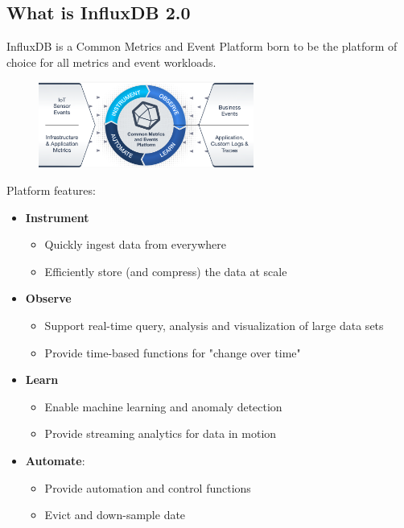 \documentclass[10pt,a4paper]{article}
\begin{document}
\subsection{What is InfluxDB 2.0}
InfluxDB is a Common Metrics and Event Platform born to be the platform of choice for all metrics and event workloads.
   \begin{figure}[ht!]
 \hfill \includegraphics[width=200pt]{images/influxdb}
 \hspace*{\fill}
 \end{figure} 
Platform features:
\begin{itemize}
	\item \textbf{Instrument}
	\begin{itemize}
		\item Quickly ingest data from everywhere
		\item Efficiently store (and compress) the data at scale
	\end{itemize}
	\item \textbf{Observe}
	\begin{itemize}
		\item Support real-time query, analysis and visualization of large data sets
		\item Provide time-based functions for "change over time"
	\end{itemize}
	\item \textbf{Learn}
	\begin{itemize}
		\item Enable machine learning and anomaly detection
		\item Provide streaming analytics for data in motion
	\end{itemize}
	\item \textbf{Automate}:
	\begin{itemize}
		\item Provide automation and control functions
		\item Evict and down-sample date
	\end{itemize}
\end{itemize}
\end{document}
